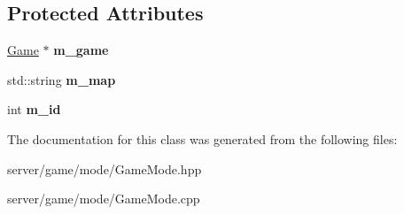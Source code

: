\subsection*{Protected Attributes}
\begin{DoxyCompactItemize}
\item 
\hypertarget{class_game_mode_a4e829d417d1b99940abbd09c3ac46f03}{\hyperlink{class_game}{Game} $\ast$ {\bfseries m\-\_\-game}}\label{class_game_mode_a4e829d417d1b99940abbd09c3ac46f03}

\item 
\hypertarget{class_game_mode_abf6c638138ae09c2bc349eb988f45304}{std\-::string {\bfseries m\-\_\-map}}\label{class_game_mode_abf6c638138ae09c2bc349eb988f45304}

\item 
\hypertarget{class_game_mode_acc86880036bbcd9f7feeb520c8e35569}{int {\bfseries m\-\_\-id}}\label{class_game_mode_acc86880036bbcd9f7feeb520c8e35569}

\end{DoxyCompactItemize}


The documentation for this class was generated from the following files\-:\begin{DoxyCompactItemize}
\item 
server/game/mode/Game\-Mode.\-hpp\item 
server/game/mode/Game\-Mode.\-cpp\end{DoxyCompactItemize}
